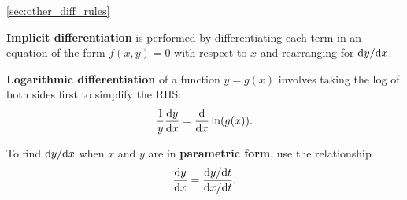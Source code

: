 \begin{recap}{\ref{sec:other_diff_rules}}
    \item \textbf{Implicit differentiation} is performed by differentiating each term in an equation of the form $f(x,y)=0$ with respect to $x$ and rearranging for ${\rm d}y/{\rm d}x$.
    \item \textbf{Logarithmic differentiation} of a function $y=g(x)$ involves taking the log of both sides first to simplify the RHS:
    \[
    \frac{1}{y}\frac{{\rm d} y}{{\rm d} x}=\frac{{\rm d} }{{\rm d} x}\ln(g(x)).
    \]
    \item To find ${\rm d}y/{\rm d}x$ when $x$ and $y$ are in \textbf{parametric form}, use the relationship
    \[
    \frac{{\rm d} y}{{\rm d} x}=\frac{{\rm d}y/{\rm d}t}{{\rm d}x/{\rm d}t}.
    \]
\end{recap}
